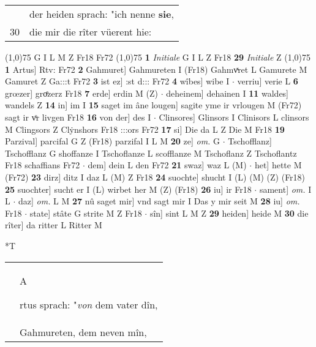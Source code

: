 \documentclass[8pt,a4paper,notitlepage]{article}
\begin{document}
\begin{table}[ht]
\begin{minipage}[t]{0.5\linewidth}
\begin{tabular}{rl}
 & der heiden sprach: "ich nenne \textbf{sie},\\ 
30 & die mir die rîter vüerent hie:\\ 
\end{tabular}
\scriptsize
\line(1,0){75} \newline
G I L M Z Fr18 Fr72 \newline
\line(1,0){75} \newline
\textbf{1} \textit{Initiale} G I L Z Fr18  \textbf{29} \textit{Initiale} Z  \newline
\line(1,0){75} \newline
\textbf{1} Artus] Rtv: Fr72 \textbf{2} Gahmuret] Gahmureten I (Fr18) Gahmvͯret L Gamurete M Gamuret Z Ga:::t Fr72 \textbf{3} ist ez] :st d::: Fr72 \textbf{4} wîbes] wibe I  $\cdot$ verriu] verie L \textbf{6} grœzer] groͤzerz Fr18 \textbf{7} erde] erdin M (Z)  $\cdot$ deheinem] dehainen I \textbf{11} waldes] wandels Z \textbf{14} in] im I \textbf{15} saget im âne lougen] sagite yme ir vrlougen M (Fr72) sagt ir vͦr livgen Fr18 \textbf{16} von der] des I  $\cdot$ Clinsores] Glinsors I Clinisors L clinsors M Clingsors Z Clẏnshors Fr18 :::ors Fr72 \textbf{17} si] Die da L Z Die M Fr18 \textbf{19} Parzival] parcifal G Z (Fr18) parzifal I L M \textbf{20} ze] \textit{om.} G  $\cdot$ Tschofflanz] Tschofflanz G shoffanze I Tschoflanze L scofflanze M Tschoflanz Z Tschoflantz Fr18 schaffians Fr72  $\cdot$ dem] dein L den Fr72 \textbf{21} swaz] waz L (M)  $\cdot$ het] hette M (Fr72) \textbf{23} dirz] ditz I daz L (M) Z Fr18 \textbf{24} suochte] shucht I (L) (M) (Z) (Fr18) \textbf{25} suochter] sucht er I (L) wirbet her M (Z) (Fr18) \textbf{26} iu] ir Fr18  $\cdot$ sament] \textit{om.} I L  $\cdot$ daz] \textit{om.} L M \textbf{27} nû saget mir] vnd sagt mir I Das y mir seit M \textbf{28} iu] \textit{om.} Fr18  $\cdot$ state] stâte G strite M Z Fr18  $\cdot$ sîn] sint L M Z \textbf{29} heiden] heide M \textbf{30} die rîter] da ritter L Ritter M \newline
\end{minipage}
\hspace{0.5cm}
\begin{minipage}[t]{0.5\linewidth}
\small
\begin{center}*T
\end{center}
\begin{tabular}{rl}
 & \begin{large}A\end{large}rtus sprach: "\textit{von} dem vater dîn,\\ 
 & Gahmureten, dem neven mîn,\\ 

\end{tabular}
\end{minipage}
\end{table}
\end{document}
